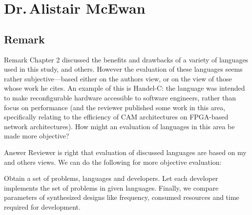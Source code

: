 \section{Dr.\,Alistair McEwan}
\setcounter{RemarkCounter}{1}
\subsection{Remark \theRemarkCounter}
\begin{frame}[allowframebreaks]
    \begin{block}{Remark \theRemarkCounter}
        Chapter 2 discussed the benefits and drawbacks of a variety of languages used in this study,
        and others. However the evaluation of these languages seems rather subjective---based either
        on the authors view, or on the view of those whose work he cites. An example of this is
        Handel-C: the language was intended to make reconfigurable hardware accessible to software
        engineers, rather than focus on performance (and the reviewer published some work in this
        area, specifically relating to the efficiency of CAM architectures on FPGA-based network
        architectures). How might an evaluation of languages in this area be made more objective?
    \end{block}
    
    \pagebreak
    
    \begin{exampleblock}{Answer}
        Reviewer is right that evaluation of discussed languages are based on my and others views. 
        We can do the following for more objective evaluation:
        \begin{enumerate}
            \fitem Obtain a set of problems, languages and developers.
            \fitem Let each developer implements the set of problems in given languages.
            \fitem Finally, we compare parameters of synthesized designs like frequency, consumed resources and time required for development.
        \end{enumerate}
    \end{exampleblock}
\end{frame}

